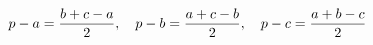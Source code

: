 \documentclass[preview]{standalone}
\begin{document}
\begin{align*}
\special{dvisvgm:raw <g id='unique000'>}p - a = \frac{b + c - a}{2} \special{dvisvgm:raw </g>}\special{dvisvgm:raw <g id='unique001'>},\quad p - b = \frac{a + c - b}{2} \special{dvisvgm:raw </g>}\special{dvisvgm:raw <g id='unique002'>},\quad p - c = \frac{a + b - c}{2}\special{dvisvgm:raw </g>}
\end{align*}
\end{document}
